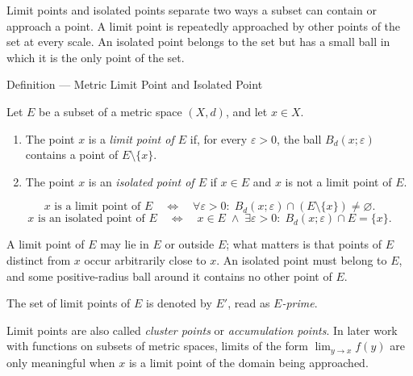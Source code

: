 \begin{remark*}[Exposition]
Limit points and isolated points separate two ways a subset can contain or
approach a point.  A limit point is repeatedly approached by other points of
the set at every scale.  An isolated point belongs to the set but has a small
ball in which it is the only point of the set.
\end{remark*}

\begin{definitionbox}{Definition --- Metric Limit Point and Isolated Point}
\begin{definition}
\label{def:metric-limit-point-isolated-point}
Let \(E\) be a subset of a metric space \((X,d)\), and let \(x\in X\).
\begin{enumerate}
  \item The point \(x\) is a \emph{limit point of \(E\)} if, for every
        \(\varepsilon>0\), the ball \(B_d(x;\varepsilon)\) contains a point of
        \(E\setminus\{x\}\).
  \item The point \(x\) is an \emph{isolated point of \(E\)} if \(x\in E\) and
        \(x\) is not a limit point of \(E\).
\end{enumerate}
\end{definition}
\end{definitionbox}

\begin{remark*}
\[
x\text{ is a limit point of }E
\quad\Longleftrightarrow\quad
\forall\varepsilon>0{:}\;
B_d(x;\varepsilon)\cap(E\setminus\{x\})\neq\varnothing.
\]
\[
x\text{ is an isolated point of }E
\quad\Longleftrightarrow\quad
x\in E
\;\land\;
\exists\varepsilon>0{:}\;
B_d(x;\varepsilon)\cap E=\{x\}.
\]
\end{remark*}

\begin{remark*}[Interpretation]
A limit point of \(E\) may lie in \(E\) or outside \(E\); what matters is that
points of \(E\) distinct from \(x\) occur arbitrarily close to \(x\).  An
isolated point must belong to \(E\), and some positive-radius ball around it
contains no other point of \(E\).
\end{remark*}

\begin{remark*}[Notation]
The set of limit points of \(E\) is denoted by \(E'\), read as
\emph{\(E\)-prime}.
\end{remark*}

\begin{remark*}[Exposition]
Limit points are also called \emph{cluster points} or \emph{accumulation
points}.  In later work with functions on subsets of metric spaces, limits of
the form \(\lim_{y\to x}f(y)\) are only meaningful when \(x\) is a limit point
of the domain being approached.
\end{remark*}


